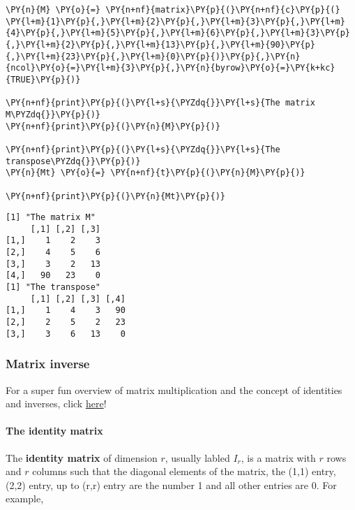     \begin{tcolorbox}[breakable, size=fbox, boxrule=1pt, pad at break*=1mm,colback=cellbackground, colframe=cellborder]
\begin{Verbatim}[commandchars=\\\{\}]
\PY{n}{M} \PY{o}{=} \PY{n+nf}{matrix}\PY{p}{(}\PY{n+nf}{c}\PY{p}{(} \PY{l+m}{1}\PY{p}{,}\PY{l+m}{2}\PY{p}{,}\PY{l+m}{3}\PY{p}{,}\PY{l+m}{4}\PY{p}{,}\PY{l+m}{5}\PY{p}{,}\PY{l+m}{6}\PY{p}{,}\PY{l+m}{3}\PY{p}{,}\PY{l+m}{2}\PY{p}{,}\PY{l+m}{13}\PY{p}{,}\PY{l+m}{90}\PY{p}{,}\PY{l+m}{23}\PY{p}{,}\PY{l+m}{0}\PY{p}{)}\PY{p}{,}\PY{n}{ncol}\PY{o}{=}\PY{l+m}{3}\PY{p}{,}\PY{n}{byrow}\PY{o}{=}\PY{k+kc}{TRUE}\PY{p}{)}

\PY{n+nf}{print}\PY{p}{(}\PY{l+s}{\PYZdq{}}\PY{l+s}{The matrix M\PYZdq{}}\PY{p}{)}
\PY{n+nf}{print}\PY{p}{(}\PY{n}{M}\PY{p}{)}

\PY{n+nf}{print}\PY{p}{(}\PY{l+s}{\PYZdq{}}\PY{l+s}{The transpose\PYZdq{}}\PY{p}{)}
\PY{n}{Mt} \PY{o}{=} \PY{n+nf}{t}\PY{p}{(}\PY{n}{M}\PY{p}{)}

\PY{n+nf}{print}\PY{p}{(}\PY{n}{Mt}\PY{p}{)}
\end{Verbatim}
\end{tcolorbox}

    \begin{Verbatim}[commandchars=\\\{\}]
[1] "The matrix M"
     [,1] [,2] [,3]
[1,]    1    2    3
[2,]    4    5    6
[3,]    3    2   13
[4,]   90   23    0
[1] "The transpose"
     [,1] [,2] [,3] [,4]
[1,]    1    4    3   90
[2,]    2    5    2   23
[3,]    3    6   13    0
    \end{Verbatim}

    \hypertarget{matrix-inverse}{%
\subsubsection{Matrix inverse}\label{matrix-inverse}}

For a super fun overview of matrix multiplication and the concept of
identities and inverses, click
\href{https://www.youtube.com/watch?v=vTtx-mC61Tw}{here}!

\hypertarget{the-identity-matrix}{%
\paragraph{The identity matrix}\label{the-identity-matrix}}

The \textbf{identity matrix} of dimension \(r\), usually labled
\(I_{r}\), is a matrix with \(r\) rows and \(r\) columns such that the
diagonal elements of the matrix, the (1,1) entry, (2,2) entry, up to
(r,r) entry are the number 1 and all other entries are 0. For example,

